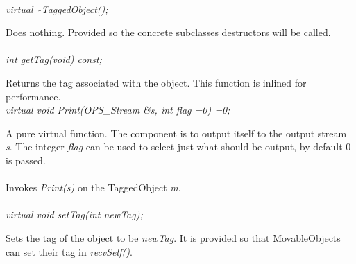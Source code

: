   \\
{\em virtual~ $\tilde{}$TaggedObject();}

Does nothing. Provided so the concrete subclasses destructors will be
called. \\

  \\
{\em int getTag(void) const;} 

Returns the tag associated with the object. This function is inlined
for performance.\\

{\em virtual void Print(OPS_Stream \&s, int flag =0) =0;} 

A pure virtual function. The component is to output itself to the output
stream {\em s}. The integer {\em flag} can be used to select just what
should be output, by default $0$ is passed. \\

 \\  
Invokes {\em Print(s)} on the TaggedObject {\em m}. \\

  \\
{\em virtual void setTag(int newTag);} 

Sets the tag of the object to be {\em newTag}. It is provided so that
MovableObjects can set their tag in {\em recvSelf()}.








